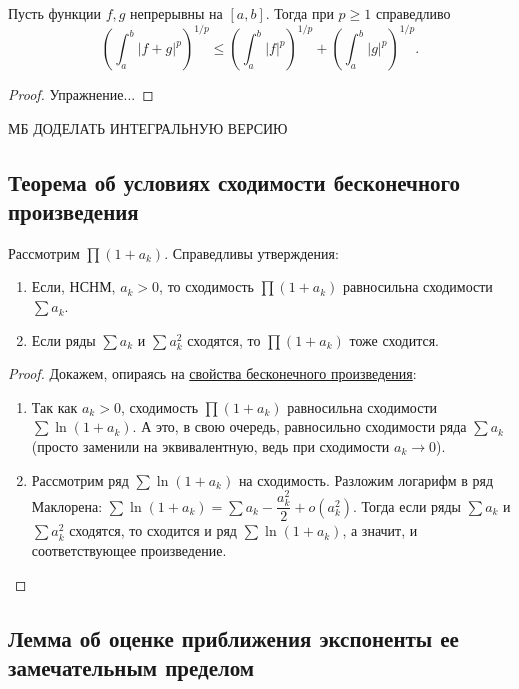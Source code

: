 \begin{ntheorem}
	Пусть функции \(f, g\) непрерывны на \([a, b]\). Тогда при \(p \geqslant 1\) справедливо \[
	\left(\int_a^b |f + g|^p \right)^{1/p} \leqslant \left(\int_a^b |f|^p \right)^{1/p} + \left(\int_a^b |g|^p \right)^{1/p}.
	\]
\end{ntheorem}
\begin{proof}
	Упражнение...
\end{proof}

МБ ДОДЕЛАТЬ ИНТЕГРАЛЬНУЮ ВЕРСИЮ

\subsection{Теорема об условиях сходимости бесконечного произведения}

\begin{theorem}
	Рассмотрим \(\prod (1 + a_k)\). Справедливы утверждения:
	\begin{enumerate}
		\item Если, НСНМ, \(a_k > 0\), то сходимость \(\prod (1 + a_k)\) равносильна сходимости \(\sum a_k\).
		\item Если ряды \(\sum a_k\) и \(\sum a_k^2\) сходятся, то \(\prod (1 + a_k)\) тоже сходится.
	\end{enumerate}
\end{theorem}
\begin{proof}
	Докажем, опираясь на \hyperlink{besk}{свойства бесконечного произведения}:
	\begin{enumerate}
		\item Так как \(a_k > 0\), сходимость \(\prod (1 + a_k)\) равносильна сходимости \(\sum \ln (1 + a_k)\). А это, в свою очередь, равносильно сходимости ряда \(\sum a_k\) (просто заменили на эквивалентную, ведь при сходимости \(a_k \to 0\)).
		\item Рассмотрим ряд \(\sum \ln (1 + a_k)\) на сходимость. Разложим логарифм в ряд Маклорена: \(\sum \ln (1 + a_k) = \sum a_k - \dfrac{a_k^2}{2} + o(a_k^2)\). Тогда если ряды \(\sum a_k\) и \(\sum a_k^2\) сходятся, то сходится и ряд \(\sum \ln (1 + a_k)\), а значит, и соответствующее произведение.
	\end{enumerate}
\end{proof}

\subsection{Лемма об оценке приближения экспоненты ее замечательным пределом}

